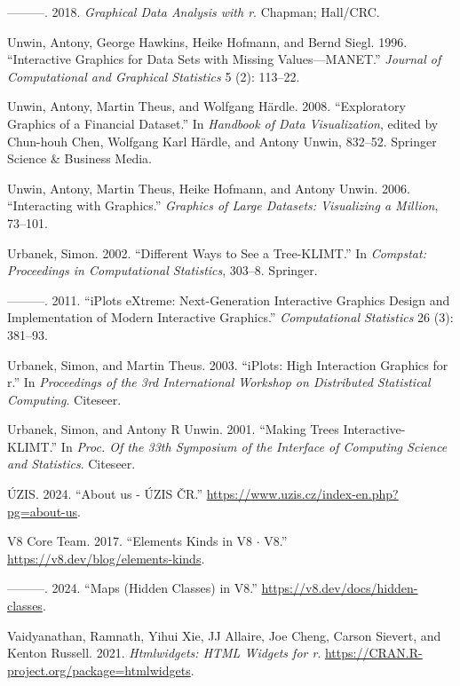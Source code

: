 \documentclass[
  openany]{book}
\newlength{\cslhangindent}
\newenvironment{CSLReferences}[2] %
 {\begin{list}{}{%
  \setlength{\itemindent}{0pt}
  \setlength{\leftmargin}{0pt}
  \setlength{\parsep}{0pt}
  \ifodd #1
   \setlength{\leftmargin}{\cslhangindent}
   \setlength{\itemindent}{-1\cslhangindent}
  \fi
  \setlength{\itemsep}{#2\baselineskip}}}
 {\end{list}}
\theoremstyle{definition}
\theoremstyle{definition}
\theoremstyle{definition}
\theoremstyle{definition}
\theoremstyle{remark}
\begin{document}
\begin{CSLReferences}{1}{0}
---------. 2018. \emph{Graphical Data Analysis with r}. Chapman; Hall/CRC.

Unwin, Antony, George Hawkins, Heike Hofmann, and Bernd Siegl. 1996. {``Interactive Graphics for Data Sets with Missing Values---MANET.''} \emph{Journal of Computational and Graphical Statistics} 5 (2): 113--22.

Unwin, Antony, Martin Theus, and Wolfgang Härdle. 2008. {``Exploratory Graphics of a Financial Dataset.''} In \emph{Handbook of Data Visualization}, edited by Chun-houh Chen, Wolfgang Karl Härdle, and Antony Unwin, 832--52. Springer Science \& Business Media.

Unwin, Antony, Martin Theus, Heike Hofmann, and Antony Unwin. 2006. {``Interacting with Graphics.''} \emph{Graphics of Large Datasets: Visualizing a Million}, 73--101.

Urbanek, Simon. 2002. {``Different Ways to See a Tree-KLIMT.''} In \emph{Compstat: Proceedings in Computational Statistics}, 303--8. Springer.

---------. 2011. {``iPlots eXtreme: Next-Generation Interactive Graphics Design and Implementation of Modern Interactive Graphics.''} \emph{Computational Statistics} 26 (3): 381--93.

Urbanek, Simon, and Martin Theus. 2003. {``iPlots: High Interaction Graphics for r.''} In \emph{Proceedings of the 3rd International Workshop on Distributed Statistical Computing}. Citeseer.

Urbanek, Simon, and Antony R Unwin. 2001. {``Making Trees Interactive-KLIMT.''} In \emph{Proc. Of the 33th Symposium of the Interface of Computing Science and Statistics}. Citeseer.

ÚZIS. 2024. {``{About us - ÚZIS ČR}.''} \url{https://www.uzis.cz/index-en.php?pg=about-us}.

V8 Core Team. 2017. {``Elements Kinds in V8 {\(\cdot\)} V8.''} \url{https://v8.dev/blog/elements-kinds}.

---------. 2024. {``Maps (Hidden Classes) in V8.''} \url{https://v8.dev/docs/hidden-classes}.

Vaidyanathan, Ramnath, Yihui Xie, JJ Allaire, Joe Cheng, Carson Sievert, and Kenton Russell. 2021. \emph{Htmlwidgets: HTML Widgets for r}. \url{https://CRAN.R-project.org/package=htmlwidgets}.


\end{CSLReferences}
\end{document}

